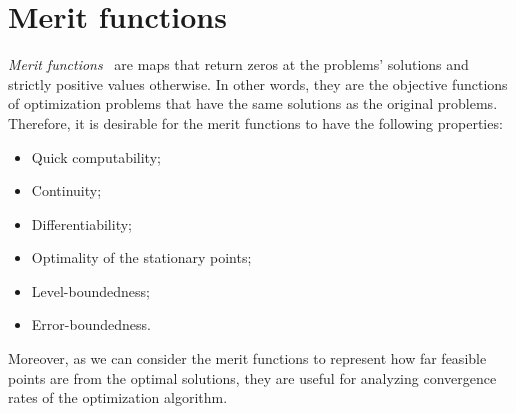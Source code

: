 \documentclass[../../main]{subfiles}
\begin{document}
\section{Merit functions} \label{sec:intro:merit}
\emph{Merit functions}~\cite{Fukushima1996} are maps that return zeros at the problems' solutions and strictly positive values otherwise.
In other words, they are the objective functions of optimization problems that have the same solutions as the original problems.
Therefore, it is desirable for the merit functions to have the following properties:
\begin{itemize}
    \item Quick computability;
    \item Continuity;
    \item Differentiability;
    \item Optimality of the stationary points;
    \item Level-boundedness;
    \item Error-boundedness.
\end{itemize}
Moreover, as we can consider the merit functions to represent how far feasible points are from the optimal solutions, they are useful for analyzing convergence rates of the optimization algorithm.




\end{document}
